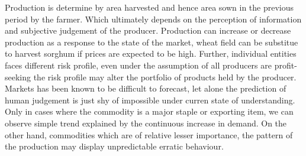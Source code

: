 \documentclass[nojss]{jss}\usepackage[]{graphicx}\usepackage[]{color}
\begin{document}
Production is determine by area harvested and hence area sown in the
previous period by the farmer. Which ultimately depends on the
perception of information and subjective judgement of the
producer. Production can increase or decrease production as a response
to the state of the market, wheat field can be substitue to harvest
sorghum if prices are expected to be high. Further, individual
entities faces different risk profile, even under the assumption of
all producers are profit-seeking the risk profile may alter the
portfolio of products held by the producer. Markets has been known to
be difficult to forecast, let alone the prediction of human judgement
is just shy of impossible under curren state of understanding.\\

Only in cases where the commodity is a major staple or exporting item,
we can observe simple trend explained by the continuous increase in
demand. On the other hand, commodities which are of relative lesser
importance, the pattern of the production may display unpredictable
erratic behaviour.\\
\end{document}
